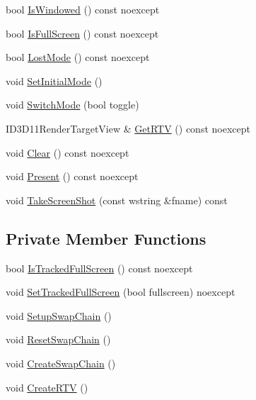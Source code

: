 \begin{DoxyCompactItemize}
\item 
bool \mbox{\hyperlink{classmage_1_1rendering_1_1_swap_chain_1_1_impl_ac7216dc943fad37a078d1a9d18eb1491}{Is\+Windowed}} () const noexcept
\item 
bool \mbox{\hyperlink{classmage_1_1rendering_1_1_swap_chain_1_1_impl_abd74163f68b0a078f970d3d54d1dcd7e}{Is\+Full\+Screen}} () const noexcept
\item 
bool \mbox{\hyperlink{classmage_1_1rendering_1_1_swap_chain_1_1_impl_ad24213091dd95a649f293fb3b3607c34}{Lost\+Mode}} () const noexcept
\item 
void \mbox{\hyperlink{classmage_1_1rendering_1_1_swap_chain_1_1_impl_a910fab71dd7977005e11179080b25f14}{Set\+Initial\+Mode}} ()
\item 
void \mbox{\hyperlink{classmage_1_1rendering_1_1_swap_chain_1_1_impl_aa3c391f6651074e73105174b68025731}{Switch\+Mode}} (bool toggle)
\item 
I\+D3\+D11\+Render\+Target\+View \& \mbox{\hyperlink{classmage_1_1rendering_1_1_swap_chain_1_1_impl_ac105ebcc013364c86cd8a7184d96df5f}{Get\+R\+TV}} () const noexcept
\item 
void \mbox{\hyperlink{classmage_1_1rendering_1_1_swap_chain_1_1_impl_ab48d24a25bd342f6a3882426e333a716}{Clear}} () const noexcept
\item 
void \mbox{\hyperlink{classmage_1_1rendering_1_1_swap_chain_1_1_impl_ae75839c2c767280d4c7e8ee009fedfe0}{Present}} () const noexcept
\item 
void \mbox{\hyperlink{classmage_1_1rendering_1_1_swap_chain_1_1_impl_abdc55ba548c3178ab3edbeeb39099a4c}{Take\+Screen\+Shot}} (const wstring \&fname) const
\end{DoxyCompactItemize}
\subsection*{Private Member Functions}
\begin{DoxyCompactItemize}
\item 
bool \mbox{\hyperlink{classmage_1_1rendering_1_1_swap_chain_1_1_impl_a47dd7e6a9a21395fc4d79dfda3d9cd61}{Is\+Tracked\+Full\+Screen}} () const noexcept
\item 
void \mbox{\hyperlink{classmage_1_1rendering_1_1_swap_chain_1_1_impl_a6f97179cc5e352a349ed943413d149e7}{Set\+Tracked\+Full\+Screen}} (bool fullscreen) noexcept
\item 
void \mbox{\hyperlink{classmage_1_1rendering_1_1_swap_chain_1_1_impl_a1e34fe9c72a24a0345a9ba317762863d}{Setup\+Swap\+Chain}} ()
\item 
void \mbox{\hyperlink{classmage_1_1rendering_1_1_swap_chain_1_1_impl_afbc1208702d9807bed1126caae22bda6}{Reset\+Swap\+Chain}} ()
\item 
void \mbox{\hyperlink{classmage_1_1rendering_1_1_swap_chain_1_1_impl_a990a602cf4639daa85210b4cbd1e525e}{Create\+Swap\+Chain}} ()
\item 
void \mbox{\hyperlink{classmage_1_1rendering_1_1_swap_chain_1_1_impl_a414e0c397b0c00a893b92845b6918ffc}{Create\+R\+TV}} ()
\end{DoxyCompactItemize}
